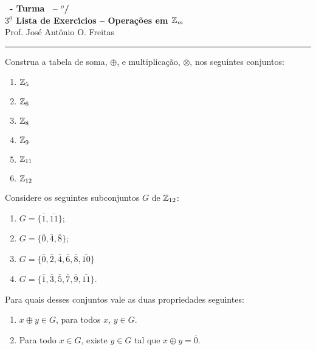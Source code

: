 \documentclass[12pt]{exam}
\begin{document}
\begin{center}
{\Large\bf \disciplina\ - Turma \turma\ -- \semestre$^{o}$/\ano} \\ \vspace{9pt} {\large\bf
  $3^{\underline{a}}$ Lista de Exerc{\'\i}cios -- Operações em $\mathbb{Z}_m$}\\ \vspace{9pt} Prof. Jos{\'e} Ant{\^o}nio O. Freitas
\end{center}
\hrule

\vspace{.6cm}

\questao{} Construa a tabela de soma, $\oplus$, e multiplicação, $\otimes$, nos seguintes conjuntos:
\begin{multicols}{3}
	\begin{enumerate}[label=({\alph*})]
		\item $\mathbb{Z}_5$
		\item $\mathbb{Z}_6$
		\item $\mathbb{Z}_8$
		\item $\mathbb{Z}_9$
		\item $\mathbb{Z}_{11}$
		\item $\mathbb{Z}_{12}$
	\end{enumerate}
\end{multicols}

\vspace{.3cm}

\questao{} Considere os seguintes subconjuntos $G$ de $\mathbb{Z}_{12}$:
\begin{multicols}{2}
	\begin{enumerate}[label=({\alph*})]
		\item $G=\{\overline{1},\overline{11}\}$;

		\item $G=\{\overline{0},\overline{4},\overline{8}\}$;

		\item $G=\{\overline{0},\overline{2},\overline{4},\overline{6},\overline{8},\overline{10}\}$
		\item $G=\{\overline{1}, \overline{3},\overline{5},\overline{7},\overline{9},\overline{11}\}$.
	\end{enumerate}
\end{multicols}

Para quais desses conjuntos vale as duas propriedades seguintes:
\begin{enumerate}[label=({\roman*})]
	\item $x \oplus y \in G$, para todos $x$, $y \in G$.
	\item Para todo $x \in G$, existe $y \in G$ tal que $x \oplus y = \overline{0}$.
\end{enumerate}
\end{document}

